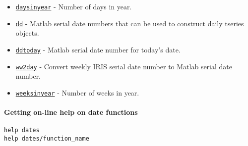 \begin{itemize}
\itemsep1pt\parskip0pt
\item
  \href{dates/daysinyear}{\texttt{daysinyear}} - Number of days in year.
\item
  \href{dates/dd}{\texttt{dd}} - Matlab serial date numbers that can be
  used to construct daily tseries objects.
\item
  \href{dates/ddtoday}{\texttt{ddtoday}} - Matlab serial date number for
  today's date.
\item
  \href{dates/ww2day}{\texttt{ww2day}} - Convert weekly IRIS serial date
  number to Matlab serial date number.
\item
  \href{dates/weeksinyear}{\texttt{weeksinyear}} - Number of weeks in
  year.
\end{itemize}

\paragraph{Getting on-line help on date
functions}\label{getting-on-line-help-on-date-functions}

\begin{verbatim}
help dates
help dates/function_name
\end{verbatim}



